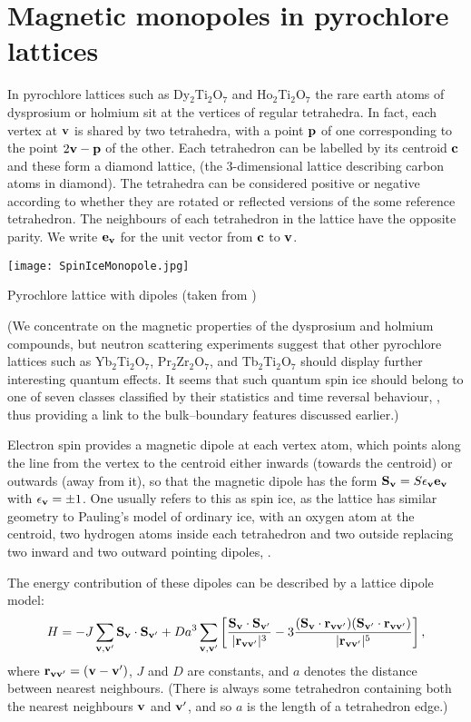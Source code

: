 \documentclass[11pt]{article}
\begin{document}
\section{Magnetic monopoles in pyrochlore lattices}

In pyrochlore lattices such as Dy$_2$Ti$_2$O$_7$ and Ho$_2$Ti$_2$O$_7$ the rare earth atoms of dysprosium or holmium sit at the vertices of regular tetrahedra. In fact, each vertex at ${\bf v}$ is shared by two tetrahedra, with a point ${\bf p}$ of one corresponding to the point $2{\bf v}-{\bf p}$ of the other. Each tetrahedron can be labelled by its centroid ${\bf c}$ and these form a diamond lattice, (the 3-dimensional lattice describing carbon atoms in diamond). The tetrahedra can be considered positive or negative according to whether they are rotated or reflected versions of the some reference tetrahedron. The neighbours of each tetrahedron in the lattice have the opposite parity.
We write ${\bf e}_{{\bf v}}$ for the unit vector from ${\bf c}$ to ${\bf v}$.

\medskip
\begin{center}
\texttt{[image: SpinIceMonopole.jpg]}

Pyrochlore lattice with dipoles (taken from \cite{C08})
\end{center}

(We concentrate on the magnetic properties of the dysprosium and holmium compounds, but neutron scattering experiments suggest that other pyrochlore lattices such as Yb$_2$Ti$_2$O$_7$, Pr$_2$Zr$_2$O$_7$, and Tb$_2$Ti$_2$O$_7$  should display further interesting quantum effects. It seems that such quantum spin ice should belong to one of seven classes classified by their statistics and time reversal behaviour, \cite{WS16}, thus providing a link to the bulk--boundary features discussed earlier.)  

Electron spin provides a magnetic dipole at each vertex atom, which points along the line from the vertex to the centroid either inwards (towards the centroid) or outwards (away from it), so that the magnetic dipole has the form ${\bf S}_{{\bf v}} = S\epsilon_{{\bf v}}{\bf e}_{{\bf v}}$ with $\epsilon_{{\bf v}} = \pm 1$.
One usually refers to this as spin ice, as the lattice has similar geometry to Pauling's model of ordinary ice, with an oxygen atom at the centroid,  two hydrogen atoms inside each tetrahedron and two outside replacing two inward and two outward pointing dipoles, \cite{P35}. 


The energy contribution of these dipoles can be described by a lattice dipole model:
$$
H = -J\sum_{{\bf v},{\bf v}^\prime} {\bf S}_{{\bf v}}\cdot {\bf S}_{{\bf v}^\prime} + Da^3\sum_{{\bf v},{\bf v}^\prime}
\left[\frac{{\bf S}_{{\bf v}}\cdot {\bf S}_{{\bf v}^\prime}}{|{\bf r}_{{\bf v}{\bf v}^\prime}|^3} - 3\frac{({\bf S}_{{\bf v}}\cdot {\bf r}_{{\bf v}{\bf v}^\prime}) ({\bf S}_{{\bf v}^\prime}\cdot {\bf r}_{{\bf v}{\bf v}^\prime})}{|{\bf r}_{{\bf v}{\bf v}^\prime}|^5}\right],
$$
where ${\bf r}_{{\bf v}{\bf v}^\prime} = ({\bf v}-{\bf v}^\prime)$, $J$ and $D$ are constants, and $a$ denotes the distance between nearest neighbours. (There is always some tetrahedron containing both the nearest neighbours ${\bf v}$ and ${\bf v}^\prime$, and so $a$ is the length of a tetrahedron edge.)  
\end{document}
